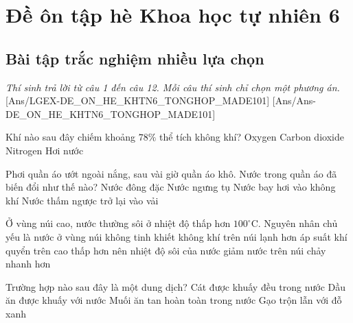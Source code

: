 \documentclass[FileMain.tex]{subfiles}
\gdef\made{101}
\begin{document}
\section[Đề ôn tập hè Khoa học tự nhiên 6 - Mã đề \made]{Đề ôn tập hè Khoa học tự nhiên 6}

\subsection{Bài tập trắc nghiệm nhiều lựa chọn}\textit{\large Thí sinh trả lời từ câu 1 đến câu 12. Mỗi câu thí sinh chỉ chọn một phương án.}
[Ans/LGEX-DE_ON_HE_KHTN6_TONGHOP_MADE101]
[Ans/Ans-DE_ON_HE_KHTN6_TONGHOP_MADE101]

\begin{ex}%
Khí nào sau đây chiếm khoảng $78\%$ thể tích không khí?
\choice
{Oxygen}
{Carbon dioxide}
{\True Nitrogen}
{Hơi nước}
\end{ex}

\begin{ex}%
Phơi quần áo ướt ngoài nắng, sau vài giờ quần áo khô. Nước trong quần áo đã biến đổi như thế nào?
\choice
{Nước đông đặc}
{Nước ngưng tụ}
{\True Nước bay hơi vào không khí}
{Nước thấm ngược trở lại vào vải}
\end{ex}

\begin{ex}%
Ở vùng núi cao, nước thường sôi ở nhiệt độ thấp hơn $100^\circ$C. Nguyên nhân chủ yếu là
\choice
{nước ở vùng núi không tinh khiết}
{không khí trên núi lạnh hơn}
{\True áp suất khí quyển trên cao thấp hơn nên nhiệt độ sôi của nước giảm}
{nước trên núi chảy nhanh hơn}
\end{ex}

\begin{ex}%
Trường hợp nào sau đây là một dung dịch?
\choice
{Cát được khuấy đều trong nước}
{Dầu ăn được khuấy với nước}
{\True Muối ăn tan hoàn toàn trong nước}
{Gạo trộn lẫn với đỗ xanh}
\end{ex}
\end{document}
